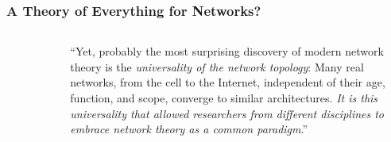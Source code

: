 \documentclass{beamer}
\begin{document}
		
		\begin{frame}\frametitle{A Theory of Everything for Networks?}
			\begin{columns}
				\begin{column}{.35\textwidth}
				\begin{figure}
					\centering
						\includegraphics[width=.9\textwidth]{barabasicropped}
					\caption{} \label{fig:}
				\end{figure}
					
				\end{column}
				\begin{column}{.65\textwidth}
				  	``Yet, probably the most surprising discovery of modern network theory is the \emph{universality of the network topology}: Many real networks, from the cell to the Internet, independent of their age, function, and scope, converge to similar architectures. \emph{It is this universality that allowed researchers from different disciplines to embrace network theory as a common paradigm}.''
			  	\end{column}
		  	\end{columns}
		\end{frame}
		
\end{document}

